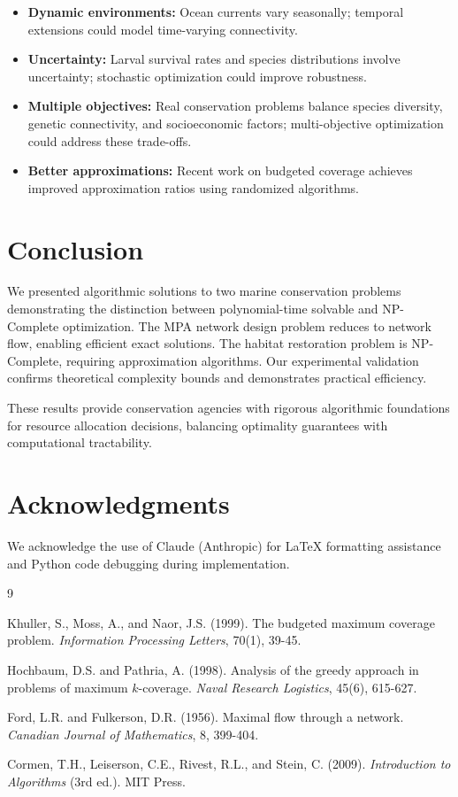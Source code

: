 \documentclass[sigconf,nonacm]{acmart}
\begin{document}
\begin{itemize}
    \item \textbf{Dynamic environments:} Ocean currents vary seasonally; temporal extensions could model time-varying connectivity.
    \item \textbf{Uncertainty:} Larval survival rates and species distributions involve uncertainty; stochastic optimization could improve robustness.
    \item \textbf{Multiple objectives:} Real conservation problems balance species diversity, genetic connectivity, and socioeconomic factors; multi-objective optimization could address these trade-offs.
    \item \textbf{Better approximations:} Recent work on budgeted coverage achieves improved approximation ratios using randomized algorithms.
\end{itemize}

\section{Conclusion}

We presented algorithmic solutions to two marine conservation problems demonstrating the distinction between polynomial-time solvable and NP-Complete optimization. The MPA network design problem reduces to network flow, enabling efficient exact solutions. The habitat restoration problem is NP-Complete, requiring approximation algorithms. Our experimental validation confirms theoretical complexity bounds and demonstrates practical efficiency.

These results provide conservation agencies with rigorous algorithmic foundations for resource allocation decisions, balancing optimality guarantees with computational tractability.

\section*{Acknowledgments}

We acknowledge the use of Claude (Anthropic) for LaTeX formatting assistance and Python code debugging during implementation.

\begin{thebibliography}{9}

Khuller, S., Moss, A., and Naor, J.S. (1999).
The budgeted maximum coverage problem.
\textit{Information Processing Letters}, 70(1), 39-45.

Hochbaum, D.S. and Pathria, A. (1998).
Analysis of the greedy approach in problems of maximum $k$-coverage.
\textit{Naval Research Logistics}, 45(6), 615-627.

Ford, L.R. and Fulkerson, D.R. (1956).
Maximal flow through a network.
\textit{Canadian Journal of Mathematics}, 8, 399-404.

Cormen, T.H., Leiserson, C.E., Rivest, R.L., and Stein, C. (2009).
\textit{Introduction to Algorithms} (3rd ed.).
MIT Press.

\end{thebibliography}
\end{document}
